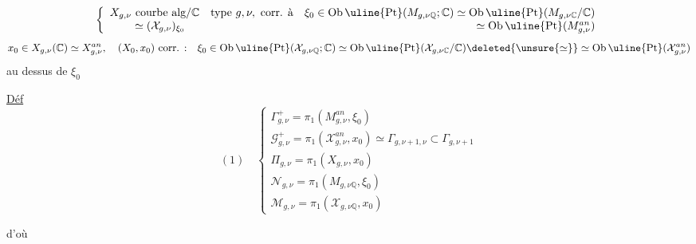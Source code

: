 
\[
\left\{\begin{array}{l}
X_{g,\nu}\ \text{courbe alg/}\mathbb C\quad\text{type }g,\nu,\ \text{corr. à}\quad
\xi_0\in\operatorname{Ob}\uline{\mathrm{Pt}}(M_{g,\nu\mathbb Q};\mathbb C)\simeq\operatorname{Ob}\uline{\mathrm{Pt}}(M_{g,\nu\mathbb C}/\mathbb C)\\
\phantom{X_{g,\nu}}\simeq(\mathcal X_{g,\nu})_{\xi_0}\hfill\simeq\operatorname{Ob}\uline{\mathrm{Pt}}(M_{g,\nu}^{an})
\end{array}\right.
\]
\[
x_0\in X_{g,\nu}(\mathbb C)\simeq X_{g,\nu}^{an},\quad (X_0,x_0)\ \text{corr. :}\quad
\xi_0\in\operatorname{Ob}\uline{\mathrm{Pt}}(\mathcal X_{g,\nu\mathbb Q};\mathbb C)\simeq\operatorname{Ob}\uline{\mathrm{Pt}}(\mathcal X_{g,\nu\mathbb C}/\mathbb C)
\deleted{\unsure{\simeq}}\simeq\operatorname{Ob}\uline{\mathrm{Pt}}(\mathcal X_{g,\nu}^{an})
\]
au dessus de $\xi_0$

\uline{Déf}
\[
(1)\quad\left\{\begin{array}{l}
\Gamma_{g,\nu}^{+}=\pi_1(M_{g,\nu}^{an},\xi_0)\\
\mathcal G_{g,\nu}^{+}=\pi_1(\mathcal X_{g,\nu}^{an},x_0)\simeq\Gamma_{g,\nu+1,\nu}\subset\Gamma_{g,\nu+1}\\
\Pi_{g,\nu}=\pi_1(X_{g,\nu},x_0)\\[4pt]
\mathcal N_{g,\nu}=\pi_1(M_{g,\nu\mathbb Q},\xi_0)\\
\mathcal M_{g,\nu}=\pi_1(\mathcal X_{g,\nu\mathbb Q},x_0)
\end{array}\right.
\]

d'où

